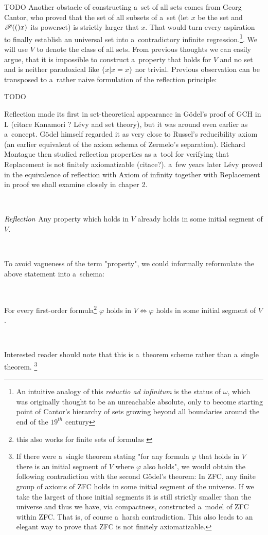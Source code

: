 TODO 
Another obstacle of constructing a~set of all sets comes from Georg Cantor, who proved that the set of all subsets of a~set (let $x$ be the set and $\mathscr{P} (()x)$ its powerset) is strictly larger that $x$. That would turn every aspiration to finally establish an universal set into a~contradictory infinite regression.\footnote{An intuitive analogy of this \emph{reductio ad infinitum} is the status of $\omega$, which was originally thought to be an unreachable absolute, only to become starting point of Cantor's hierarchy of sets growing beyond all boundaries around the end of the $19^{th}$ century}. We will use $V$ to denote the class of all sets. %
From previous thoughts we can easily argue, that it is impossible to construct a~property that holds for $V$ and no set and is neither paradoxical like $\{x  |  x = x\}$ nor trivial. Previous observation can be transposed to a~rather naive formulation of the reflection principle:

TODO

Reflection made its first in set-theoretical appearance in G{\"o}del's proof of GCH in L  (citace Kanamori ? Lévy and set theory), but it was around even earlier as a~concept. G{\"o}del himself regarded it as very close to Russel's reducibility axiom (an earlier equivalent of the axiom schema of Zermelo's separation). Richard Montague then studied reflection properties as a~tool for verifying that Replacement is not finitely axiomatizable (citace?). a~few years later Lévy proved in \cite{Levy60a} the equivalence of reflection with Axiom of infinity together with Replacement in proof we shall examine closely in chaper 2.

\

$\emph{Reflection}$ Any property which holds in $V$ already holds in some initial segment of $V$. 

\

To avoid vagueness of the term "property", we could informally reformulate the above statement into a~schema: 

\

For every first-order formula\footnote{this also works for finite sets of formulas \cite[p.~168]{JechBook}} $\varphi$ holds in $V \iff \varphi$ holds in some initial segment of $V$.

\

Interested reader should note that this is a~theorem scheme rather than a~single theorem. \footnote{If there were a~single theorem stating "for any formula $\varphi$ that holds in $V$ there is an initial segment of $V$ where $\varphi$ also holds", we would obtain the following contradiction with the second G{\"o}del's theorem: In ZFC, any finite group of axioms of ZFC holds in some initial segment of the universe. If we take the largest of those initial segments it is still strictly smaller than the universe and thus we have, via compactness, constructed a~model of ZFC within ZFC. That is, of course a~harsh contradiction. This also leads to an elegant way to prove that ZFC is not finitely axiomatizable.}

